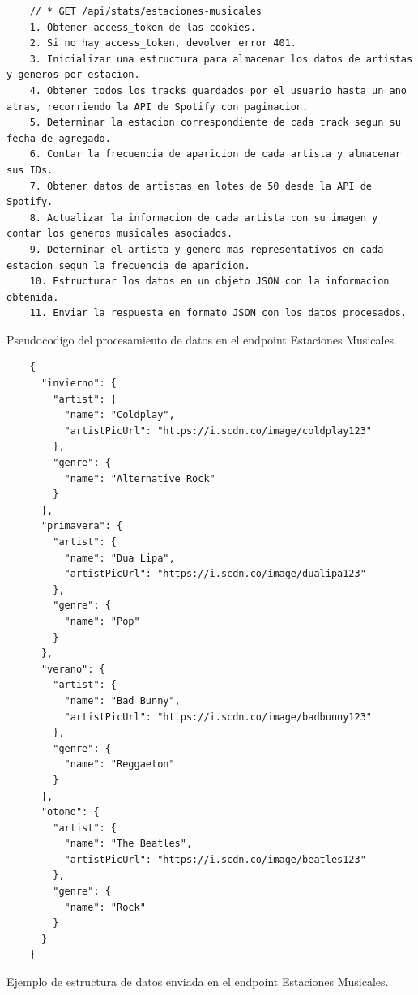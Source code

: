 \begin{ifalgorithm}[H]
    \begin{lstlisting}
    // * GET /api/stats/estaciones-musicales
    1. Obtener access_token de las cookies.
    2. Si no hay access_token, devolver error 401.
    3. Inicializar una estructura para almacenar los datos de artistas y generos por estacion.
    4. Obtener todos los tracks guardados por el usuario hasta un ano atras, recorriendo la API de Spotify con paginacion.
    5. Determinar la estacion correspondiente de cada track segun su fecha de agregado.
    6. Contar la frecuencia de aparicion de cada artista y almacenar sus IDs.
    7. Obtener datos de artistas en lotes de 50 desde la API de Spotify.
    8. Actualizar la informacion de cada artista con su imagen y contar los generos musicales asociados.
    9. Determinar el artista y genero mas representativos en cada estacion segun la frecuencia de aparicion.
    10. Estructurar los datos en un objeto JSON con la informacion obtenida.
    11. Enviar la respuesta en formato JSON con los datos procesados.
    \end{lstlisting}
    \caption{Pseudocodigo del procesamiento de datos en el endpoint Estaciones Musicales.}
    \label{alg:estaciones_musicales}
\end{ifalgorithm}

\begin{ifalgorithm}[H]
    \begin{lstlisting}
    {
      "invierno": {
        "artist": {
          "name": "Coldplay",
          "artistPicUrl": "https://i.scdn.co/image/coldplay123"
        },
        "genre": {
          "name": "Alternative Rock"
        }
      },
      "primavera": {
        "artist": {
          "name": "Dua Lipa",
          "artistPicUrl": "https://i.scdn.co/image/dualipa123"
        },
        "genre": {
          "name": "Pop"
        }
      },
      "verano": {
        "artist": {
          "name": "Bad Bunny",
          "artistPicUrl": "https://i.scdn.co/image/badbunny123"
        },
        "genre": {
          "name": "Reggaeton"
        }
      },
      "otono": {
        "artist": {
          "name": "The Beatles",
          "artistPicUrl": "https://i.scdn.co/image/beatles123"
        },
        "genre": {
          "name": "Rock"
        }
      }
    }
    \end{lstlisting}
    \caption{Ejemplo de estructura de datos enviada en el endpoint Estaciones Musicales.}
    \label{alg:estaciones_musicales_response}
\end{ifalgorithm}

